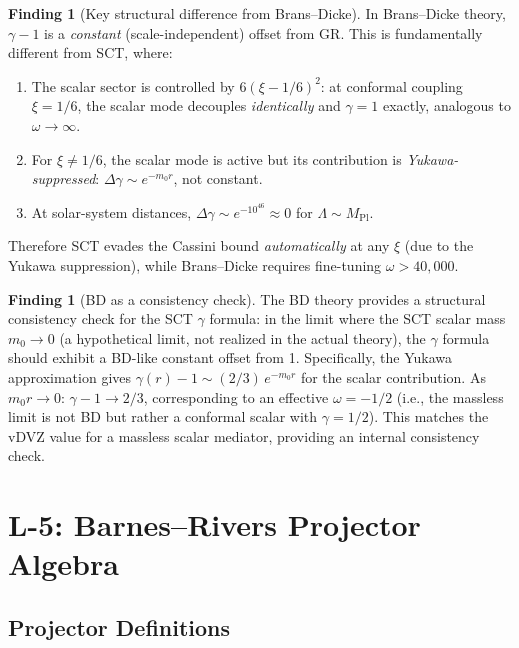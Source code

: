 \documentclass[11pt,a4paper]{article}
\theoremstyle{plain}
\theoremstyle{definition}
\newtheorem{finding}[theorem]{Finding}
\theoremstyle{remark}
\begin{document}
\begin{finding}[Key structural difference from Brans--Dicke]
\label{find:bd-vs-sct}
In Brans--Dicke theory, $\gamma - 1$ is a \emph{constant}
(scale-independent) offset from GR.  This is fundamentally different
from SCT, where:
\begin{enumerate}[nosep]
  \item The scalar sector is controlled by $6(\xi - 1/6)^2$:
    at conformal coupling $\xi = 1/6$, the scalar mode decouples
    \emph{identically} and $\gamma = 1$ exactly, analogous to
    $\omega \to \infty$.
  \item For $\xi \neq 1/6$, the scalar mode is active but its
    contribution is \emph{Yukawa-suppressed}: $\Delta\gamma \sim
    e^{-m_0 r}$, not constant.
  \item At solar-system distances, $\Delta\gamma \sim e^{-10^{46}}
    \approx 0$ for $\Lambda \sim M_{\mathrm{Pl}}$.
\end{enumerate}
Therefore SCT evades the Cassini bound \emph{automatically} at any
$\xi$ (due to the Yukawa suppression), while Brans--Dicke requires
fine-tuning $\omega > 40{,}000$.
\end{finding}

\begin{finding}[BD as a consistency check]\label{find:bd-check}
The BD theory provides a structural consistency check for the SCT
$\gamma$ formula: in the limit where the SCT scalar mass $m_0 \to 0$
(a hypothetical limit, not realized in the actual theory), the
$\gamma$ formula should exhibit a BD-like constant offset from 1.
Specifically, the Yukawa approximation gives $\gamma(r) - 1 \sim
(2/3)\,e^{-m_0 r}$ for the scalar contribution.  As $m_0 r \to 0$:
$\gamma - 1 \to 2/3$, corresponding to an effective $\omega = -1/2$
(i.e., the massless limit is not BD but rather a conformal scalar
with $\gamma = 1/2$).  This matches the vDVZ value for a massless
scalar mediator, providing an internal consistency check.
\end{finding}


\section{L-5: Barnes--Rivers Projector Algebra}\label{sec:projectors}

\subsection{Projector Definitions}
\end{document}

